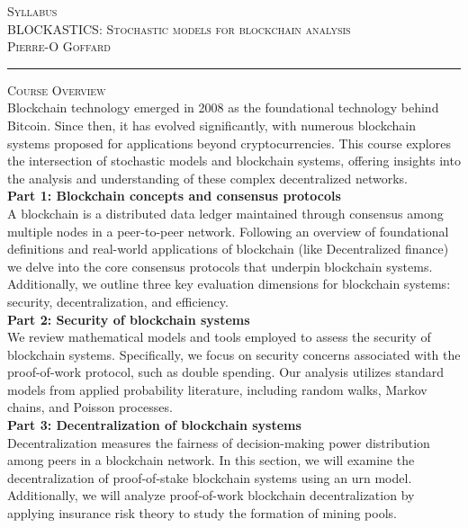 \documentclass[11pt]{article}
\def\title{Syllabus}
\def\course{BLOCKASTICS: Stochastic models for blockchain analysis }
\def\profName{Pierre-O Goffard }
\begin{document}
{\center \textsc{\Large \title\\
	\large\course\\
	 \profName %
	}\\
	\vspace*{2em}
	\hrule
\vspace*{2em}}


\textsc{Course Overview}\\

Blockchain technology emerged in 2008 as the foundational technology behind Bitcoin. Since then, it has evolved significantly, with numerous blockchain systems proposed for applications beyond cryptocurrencies. This course explores the intersection of stochastic models and blockchain systems, offering insights into the analysis and understanding of these complex decentralized networks.
\\

\noindent \textbf{Part 1: Blockchain concepts and consensus protocols}\\
\noindent A blockchain is a distributed data ledger maintained through consensus among multiple nodes in a peer-to-peer network. Following an overview of foundational definitions and real-world applications of blockchain (like Decentralized finance) we delve into the core consensus protocols that underpin blockchain systems. Additionally, we outline three key evaluation dimensions for blockchain systems: security, decentralization, and efficiency.   
\\

\noindent \textbf{Part 2: Security of blockchain systems}\\
\noindent We review mathematical models and tools employed to assess the security of blockchain systems. Specifically, we focus on security concerns associated with the proof-of-work protocol, such as double spending. Our analysis utilizes standard models from applied probability literature, including random walks, Markov chains, and Poisson processes.
\\

\noindent \textbf{Part 3: Decentralization of blockchain systems}\\
\noindent Decentralization measures the fairness of decision-making power distribution among peers in a blockchain network. In this section, we will examine the decentralization of proof-of-stake blockchain systems using an urn model. Additionally, we will analyze proof-of-work blockchain decentralization by applying insurance risk theory to study the formation of mining pools.      
\\
\end{document}
